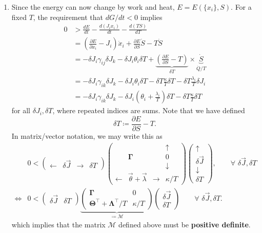 \documentclass{article}
\theoremstyle{definition}
\newcommand{\p}{\partial}
\newcommand{\f}[2]{\frac{#1}{#2}}
\newcommand{\lp}{\left(}
\newcommand{\rp}{\right)}
\begin{document}
\begin{enumerate}[label=(\alph*)]
	\item Since the energy can now change by work and heat, $E = E(\{x_i\},S)$. For a fixed $T$, the requirement that $dG/dt < 0$ implies
	\begin{align*}
	0 &>  \f{dE}{dt} -\f{d(J_i x_i)}{dt} - \f{d(TS)}{dT} \\
	&= \lp \f{\p E}{\p x_i} - J_i\rp \dot{x}_i + \f{\p E}{\p S}\dot{S} - T\dot{S} \\  
	&= -\delta J_i \gamma_{ij} \delta J_k - \delta J_i \theta_i \delta T + \underbrace{\lp \f{\p E}{\p S} - T \rp}_{\delta T} \times \underbrace{\dot{S}}_{\dot{Q}/T} \\
	&= -\delta J_i\gamma_{ik} \delta J_k - \delta J_i \theta_i \delta T - \delta T \f{\kappa}{T} \delta T - \delta T \f{\lambda_i}{T}  \delta J_i \\
	&= -\delta J_i\gamma_{ik} \delta J_k - \delta J_i \lp \theta_i +\f{\lambda_i}{T} \rp \delta T - \delta T \f{\kappa}{T} \delta T
	\end{align*}
	for all $\delta J_i, \delta T$, where repeated indices are sums. Note that we have defined 
	\begin{equation*}
	\delta T \coloneqq \f{\p E}{\p S} - T.
	\end{equation*}
	In matrix/vector notation, we may write this as 
	\begin{align*}
	&0 < \begin{pmatrix}
	\leftarrow &
	\delta \vec{J} &
	\rightarrow &
	\delta T
	\end{pmatrix}
	\begin{pmatrix}
	&&& \uparrow \\
	& \mathbf{\Gamma} & & {0}\\
	&&&\downarrow\\
	\leftarrow& \vec{\theta} + \vec{\lambda}& \rightarrow & \kappa/T 
	\end{pmatrix}
	\begin{pmatrix}
	\uparrow \\
	\delta \vec{J} \\
	\downarrow \\
	\delta T
	\end{pmatrix}, \quad\quad \forall \,\,\delta \vec{J}, \delta T\\
	\iff 
	&0 < \begin{pmatrix}
	\delta \vec{J} &
	\delta T
	\end{pmatrix}
	\underbrace{\begin{pmatrix}
	\mathbf{\Gamma} & 0\\
	\mathbf{\Theta}^\top + \mathbf{\Lambda}^\top/T & \kappa/T 
	\end{pmatrix}}_{\coloneqq \mathcal{M}}
	\begin{pmatrix}
	\delta \vec{J} \\
	\delta T
	\end{pmatrix} \quad\quad \forall \,\,\delta \vec{J}, \delta T.
	\end{align*}
	which implies that the matrix $\mathcal{M}$ defined above must be \textbf{positive definite}.
\end{enumerate}
\end{document}
